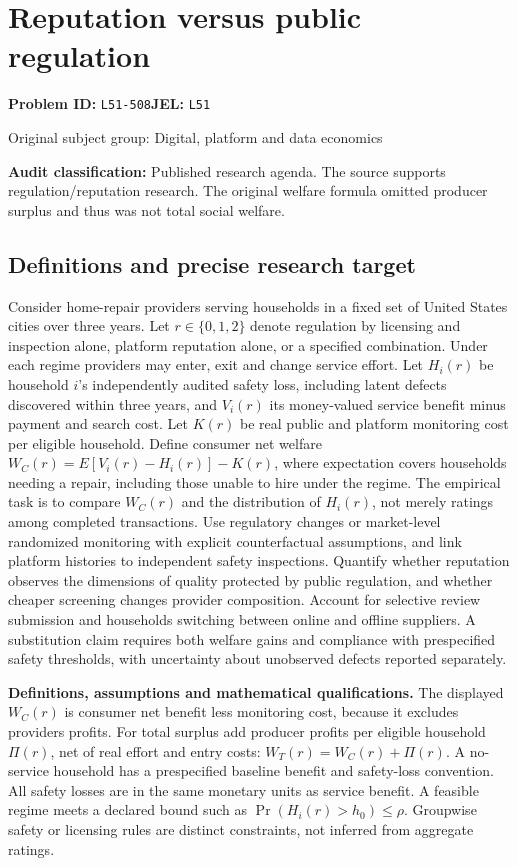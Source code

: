 \documentclass[11pt,a4paper]{article}
\begin{document}
\section*{Reputation versus public regulation}
\textbf{Problem ID:} \texttt{L51-508}\quad \textbf{JEL:} \texttt{L51}\par
\label{problem:OP-0405}
{\sffamily\small\color{muted}Original subject group: Digital, platform and data economics\par}
\label{definitions:problem:30007687}
\textbf{Audit classification:} Published research agenda. The source supports regulation/reputation research. The original welfare formula omitted producer surplus and thus was not total social welfare.
\subsection*{Definitions and precise research target}
Consider home-repair providers serving households in a fixed set of United States cities over three years. Let \(r\in\{0,1,2\}\) denote regulation by licensing and inspection alone, platform reputation alone, or a specified combination. Under each regime providers may enter, exit and change service effort. Let \(H_i(r)\) be household \(i\)'s independently audited safety loss, including latent defects discovered within three years, and \(V_i(r)\) its money-valued service benefit minus payment and search cost. Let \(K(r)\) be real public and platform monitoring cost per eligible household. Define consumer net welfare \(W_C(r)=E[V_i(r)-H_i(r)]-K(r)\), where expectation covers households needing a repair, including those unable to hire under the regime. The empirical task is to compare \(W_C(r)\) and the distribution of \(H_i(r)\), not merely ratings among completed transactions. Use regulatory changes or market-level randomized monitoring with explicit counterfactual assumptions, and link platform histories to independent safety inspections. Quantify whether reputation observes the dimensions of quality protected by public regulation, and whether cheaper screening changes provider composition. Account for selective review submission and households switching between online and offline suppliers. A substitution claim requires both welfare gains and compliance with prespecified safety thresholds, with uncertainty about unobserved defects reported separately.

\textbf{Definitions, assumptions and mathematical qualifications.} The displayed \(W_C(r)\) is consumer net benefit less monitoring cost, because it excludes providers profits. For total surplus add producer profits per eligible household \(\Pi(r)\), net of real effort and entry costs: \(W_T(r)=W_C(r)+\Pi(r)\). A no-service household has a prespecified baseline benefit and safety-loss convention. All safety losses are in the same monetary units as service benefit. A feasible regime meets a declared bound such as \(\Pr(H_i(r)>h_0)\leq\rho\). Groupwise safety or licensing rules are distinct constraints, not inferred from aggregate ratings.
\end{document}
